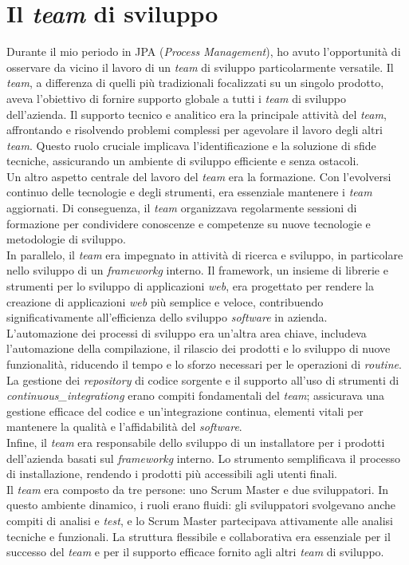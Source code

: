 \section{Il \textit{team} di sviluppo}

Durante il mio periodo in JPA (\textit{Process Management}), ho avuto l'opportunità di osservare da vicino il lavoro di un \textit{team} di sviluppo particolarmente versatile. 
Il \textit{team}, a differenza di quelli più tradizionali focalizzati su un singolo prodotto, aveva l'obiettivo di fornire supporto globale a tutti i \textit{team} di sviluppo dell'azienda.
\noindent Il supporto tecnico e analitico era la principale attività del \textit{team}, affrontando e risolvendo problemi complessi per agevolare il lavoro degli altri \textit{team}. 
Questo ruolo cruciale implicava l'identificazione e la soluzione di sfide tecniche, assicurando un ambiente di sviluppo efficiente e senza ostacoli. \\
\noindent Un altro aspetto centrale del lavoro del \textit{team} era la formazione. Con l'evolversi continuo delle tecnologie e degli strumenti, era essenziale mantenere i \textit{team} aggiornati. Di conseguenza, il \textit{team} organizzava regolarmente sessioni di formazione per condividere conoscenze e competenze su nuove tecnologie e metodologie di sviluppo. \\
\noindent In parallelo, il \textit{team} era impegnato in attività di ricerca e sviluppo, in particolare nello sviluppo di un \textit{\gls{frameworkg}} interno. Il framework, un insieme di librerie e strumenti per lo sviluppo di applicazioni \textit{web}, era progettato per rendere la creazione di applicazioni \textit{web} più semplice e veloce, contribuendo significativamente all'efficienza dello sviluppo \textit{software} in azienda. \\
\noindent L'automazione dei processi di sviluppo era un'altra area chiave, includeva l'automazione della compilazione, il rilascio dei prodotti e lo sviluppo di nuove funzionalità, riducendo il tempo e lo sforzo necessari per le operazioni di \textit{routine}. \\
\noindent La gestione dei \textit{\gls{repository}} di codice sorgente e il supporto all'uso di strumenti di \textit{\gls{continuous_integrationg}} erano compiti fondamentali del \textit{team}; assicurava una gestione efficace del codice e un'integrazione continua, elementi vitali per mantenere la qualità e l'affidabilità del \textit{software}. \\
\noindent Infine, il \textit{team} era responsabile dello sviluppo di un installatore per i prodotti dell'azienda basati sul \textit{\gls{frameworkg}} interno. Lo strumento semplificava il processo di installazione, rendendo i prodotti più accessibili agli utenti finali. \\
\noindent Il \textit{team} era composto da tre persone: uno \gls{Scrum Master} e due sviluppatori. In questo ambiente dinamico, i ruoli erano fluidi: gli sviluppatori svolgevano anche compiti di analisi e \textit{test}, e lo \gls{Scrum Master} partecipava attivamente alle analisi tecniche e funzionali. La struttura flessibile e collaborativa era essenziale per il successo del \textit{team} e per il supporto efficace fornito agli altri \textit{team} di sviluppo. \\
